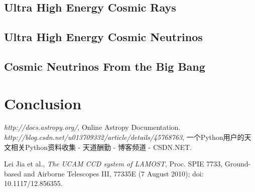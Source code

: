 \documentclass[12pt,twoside,letterpaper]{article}
\begin{document}
\subsection{Ultra High Energy Cosmic Rays} 

\subsection{Ultra High Energy Cosmic Neutrinos} 

\subsection{Cosmic Neutrinos From the Big Bang} 

\section{Conclusion} 


   \begin{thebibliography}{99}



      \emph{http://docs.astropy.org/}, Online Astropy Documentation.
      \emph{http://blog.csdn.net/u013709332/article/details/45768763}, 一个Python用户的天文相关Python资料收集 - 天道酬勤 - 博客频道 - CSDN.NET.

      Lei Jia et al., \emph{The UCAM CCD system of LAMOST}, Proc. SPIE 7733, Ground-based and Airborne Telescopes III, 77335E (7 August 2010); doi: 10.1117/12.856355.


   \end{thebibliography}
\end{document}
